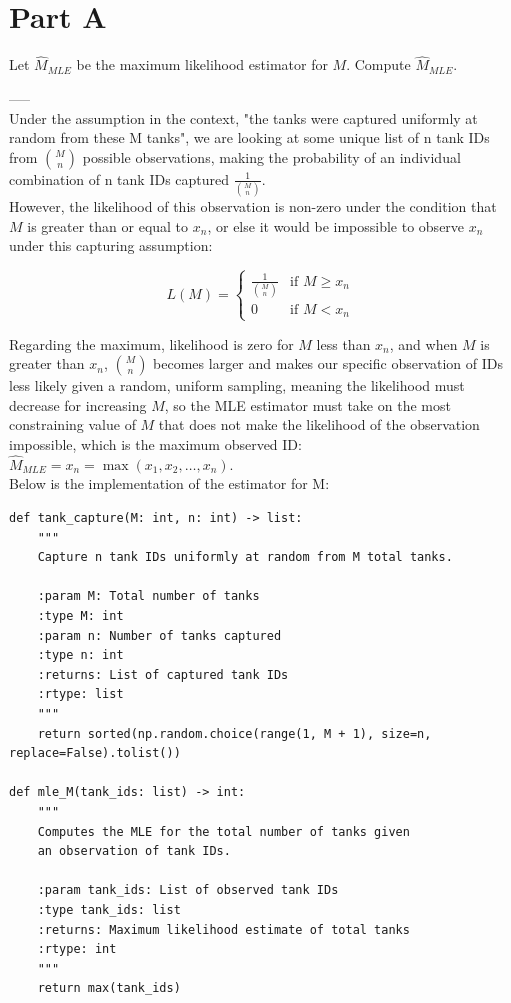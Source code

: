 \section{Part A}
Let $\hat{M}_{MLE}$ be the maximum likelihood estimator for $M$. Compute $\hat{M}_{MLE}$.

-----\\
Under the assumption in the context, "the tanks were captured uniformly at random from these M tanks", we are looking at some unique list of n tank IDs from $\binom{M}{n}$ possible observations, making the probability of an individual combination of n tank IDs captured $\frac{1}{\binom{M}{n}}$.\\

However, the likelihood of this observation is non-zero under the condition that $ M $ is greater than or equal to $ x_n $, or else it would be impossible to observe $ x_n $ under this capturing assumption:

$$L(M) = \begin{cases}
\frac{1}{\binom{M}{n}} & \text{if } M \geq x_n \\
0 & \text{if } M < x_n
\end{cases}$$

Regarding the maximum, likelihood is zero for $ M $ less than $ x_n $, and when $ M $ is greater than $ x_n $, $\binom{M}{n}$ becomes larger and makes our specific observation of IDs less likely given a random, uniform sampling, meaning the likelihood must decrease for increasing $ M $, so the MLE estimator must take on the most constraining value of $ M $ that does not make the likelihood of the observation impossible, which is the maximum observed ID: $ \hat{M}_{MLE} = x_n = \max(x_1, x_2, \ldots, x_n) $.\\

Below is the implementation of the estimator for M:

\begin{verbatim}
def tank_capture(M: int, n: int) -> list:
    """
    Capture n tank IDs uniformly at random from M total tanks.

    :param M: Total number of tanks
    :type M: int
    :param n: Number of tanks captured
    :type n: int
    :returns: List of captured tank IDs
    :rtype: list
    """
    return sorted(np.random.choice(range(1, M + 1), size=n, replace=False).tolist())

def mle_M(tank_ids: list) -> int:
    """
    Computes the MLE for the total number of tanks given
    an observation of tank IDs.

    :param tank_ids: List of observed tank IDs
    :type tank_ids: list
    :returns: Maximum likelihood estimate of total tanks
    :rtype: int
    """
    return max(tank_ids)
\end{verbatim}

